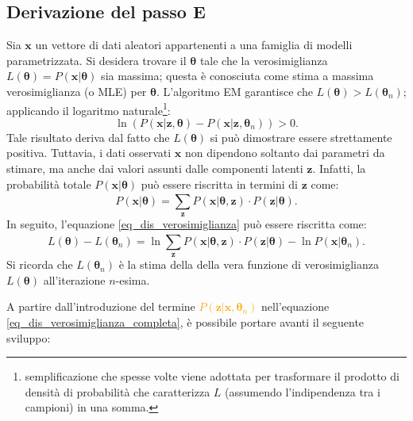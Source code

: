 \subsection{Derivazione del passo E}
Sia $\mathbf{x}$ un vettore di dati aleatori appartenenti a una famiglia di modelli parametrizzata. Si desidera trovare il $\boldsymbol{\theta}$ tale che la verosimiglianza $L(\boldsymbol{\theta})=P(\mathbf{x} | \boldsymbol{\theta})$ sia massima; questa è conosciuta come stima a massima verosimiglianza (o  MLE) per $\boldsymbol{\theta}$. L'algoritmo EM garantisce che $L(\boldsymbol{\theta}) > L(\boldsymbol{\theta}_n)$; applicando il logaritmo naturale\footnote{semplificazione che spesse volte viene adottata per trasformare il prodotto di densità di probabilità che caratterizza $L$ (assumendo l'indipendenza tra i campioni) in una somma.}:
\begin{equation}
	\ln(P(\mathbf{x}|\mathbf{z},\boldsymbol{\theta}) - P(\mathbf{x}|\mathbf{z},\boldsymbol{\theta}_n)) > 0.
	\label{eq_dis_verosimiglianza}
\end{equation}
Tale risultato deriva dal fatto che $L(\boldsymbol{\theta})$ si può dimostrare essere strettamente positiva. Tuttavia, i dati osservati $\mathbf{x}$ non dipendono soltanto dai parametri da stimare, ma anche dai valori assunti dalle componenti latenti $\mathbf{z}$. Infatti, la probabilità totale $P(\mathbf{x}|\boldsymbol{\theta})$ può essere riscritta in termini di $\mathbf{z}$ come:
\begin{equation}
	P(\mathbf{x}|\boldsymbol{\theta}) = \sum_{\mathbf{z}}^{}P(\mathbf{x}|\boldsymbol{\theta}, \mathbf{z})\cdot P(\mathbf{z}|\boldsymbol{\theta}).
\end{equation}
In seguito, l'equazione \ref{eq_dis_verosimiglianza} può essere riscritta come:
\begin{equation}
	L(\boldsymbol{\theta}) - L(\boldsymbol{\theta}_n) = \ln\sum_{\mathbf{z}}^{} P(\mathbf{x}|\boldsymbol{\theta}, \mathbf{z})\cdot P(\mathbf{z}|\boldsymbol{\theta}) - \ln P(\mathbf{x}|\boldsymbol{\theta}_n).
	\label{eq_dis_verosimiglianza_completa}
\end{equation}
Si ricorda che $L(\boldsymbol{\theta}_n)$ è la stima della della vera funzione di verosimiglianza $L(\boldsymbol{\theta})$ all'iterazione $n$-esima. \par A partire dall'introduzione del termine \textcolor{orange}{$P(\mathbf{z}|\mathbf{x},\boldsymbol{\theta}_n)$} nell'equazione \ref{eq_dis_verosimiglianza_completa}, è possibile portare avanti il seguente sviluppo:
